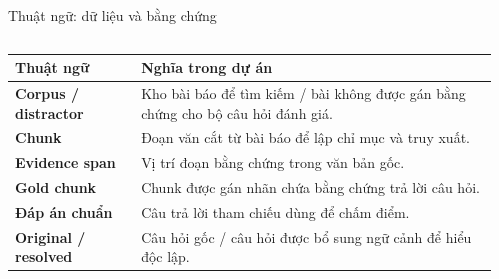 \begin{frame}[t]{Thuật ngữ: dữ liệu và bằng chứng}
\begin{columns}[T,onlytextwidth]
\begin{column}{.70\textwidth}
{\tabletext\begin{tabularx}{\linewidth}{@{}>{\raggedright\arraybackslash\bfseries}p{55mm}L@{}}
Thuật ngữ & \textbf{Nghĩa trong dự án} \\\midrule
Corpus / distractor & Kho bài báo để tìm kiếm / bài không được gán bằng chứng cho bộ câu hỏi đánh giá. \\\midrule
Chunk & Đoạn văn cắt từ bài báo để lập chỉ mục và truy xuất. \\\midrule
Evidence span & Vị trí đoạn bằng chứng trong văn bản gốc. \\\midrule
Gold chunk & Chunk được gán nhãn chứa bằng chứng trả lời câu hỏi. \\\midrule
Đáp án chuẩn & Câu trả lời tham chiếu dùng để chấm điểm. \\\midrule
Original / resolved & Câu hỏi gốc / câu hỏi được bổ sung ngữ cảnh để hiểu độc lập. \\\bottomrule
\end{tabularx}}
\end{column}
\begin{column}{.26\textwidth}\centering
{}
\end{column}\end{columns}
\end{frame}
